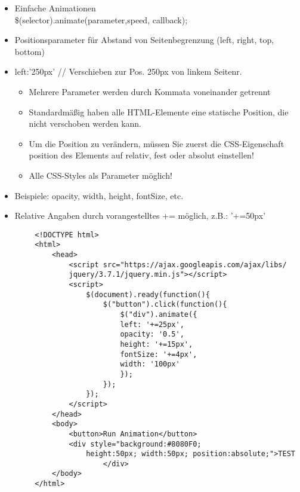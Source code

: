 \documentclass[10pt]{article}
\begin{document}
    \begin{tcolorbox}[
    colback=Red!5!white,
    colframe=Red!75!black,
    title={\centering Animationen}]
    \begin{itemize}
        \item Einfache Animationen \\ \$(selector).animate({parameter},speed, callback);
    \end{itemize}
    \begin{itemize}
        \item Positionsparameter für Abstand von Seitenbegrenzung (left, right, top, bottom)
        \item left:'250px' // Verschieben zur Pos. 250px von linkem Seitenr.
        \begin{itemize}
            \item Mehrere Parameter werden durch Kommata voneinander getrennt
            \item Standardmäßig haben alle HTML-Elemente eine statische Position, die nicht verschoben werden kann.
            \item Um die Position zu verändern, müssen Sie zuerst die CSS-Eigenschaft position des Elements auf relativ, fest oder absolut einstellen!
            \item Alle CSS-Styles als Parameter möglich!
        \end{itemize}
        \item Beispiele: opacity, width, height, fontSize, etc.
        \item Relative Angaben durch vorangestelltes += möglich, z.B.: '+=50px'
    \end{itemize}
    \end{tcolorbox}

    \begin{tcolorbox}[
    colback=Red!5!white,
    colframe=Red!75!black,
    title={\centering Beispiel}]
    \begin{lstlisting}
        <!DOCTYPE html>
        <html>
            <head>
                <script src="https://ajax.googleapis.com/ajax/libs/
                jquery/3.7.1/jquery.min.js"></script>
                <script>
                    $(document).ready(function(){
                        $("button").click(function(){
                            $("div").animate({
                            left: '+=25px',
                            opacity: '0.5',
                            height: '+=15px',
                            fontSize: '+=4px',
                            width: '100px'
                            });
                        });
                    });
                </script>
            </head>
            <body>
                <button>Run Animation</button>
                <div style="background:#8080F0;
                    height:50px; width:50px; position:absolute;">TEST
                        </div>
            </body>
        </html>
    \end{lstlisting}
    \end{tcolorbox}
\end{document}
